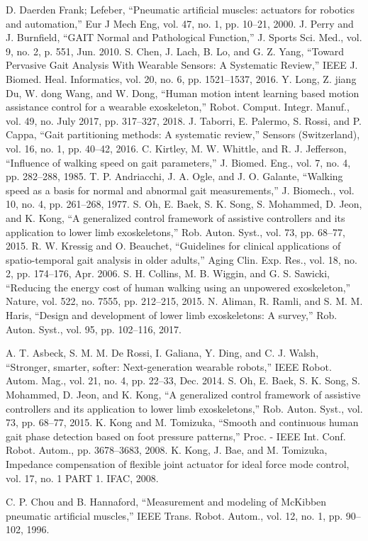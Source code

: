 \documentclass[paper,JRM,paper]{jaciiiarticle}
\begin{document}
\begin{thebibliography}{99}
	D. Daerden Frank; Lefeber, “Pneumatic artificial muscles: actuators for robotics and automation,” Eur J Mech Eng, vol. 47, no. 1, pp. 10–21, 2000.
	J. Perry and J. Burnfield, “GAIT Normal and Pathological Function,” J. Sports Sci. Med., vol. 9, no. 2, p. 551, Jun. 2010.
	S. Chen, J. Lach, B. Lo, and G. Z. Yang, “Toward Pervasive Gait Analysis With Wearable Sensors: A Systematic Review,” IEEE J. Biomed. Heal. Informatics, vol. 20, no. 6, pp. 1521–1537, 2016.
	Y. Long, Z. jiang Du, W. dong Wang, and W. Dong, “Human motion intent learning based motion assistance control for a wearable exoskeleton,” Robot. Comput. Integr. Manuf., vol. 49, no. July 2017, pp. 317–327, 2018.
	J. Taborri, E. Palermo, S. Rossi, and P. Cappa, “Gait partitioning methods: A systematic review,” Sensors (Switzerland), vol. 16, no. 1, pp. 40–42, 2016.
	C. Kirtley, M. W. Whittle, and R. J. Jefferson, “Influence of walking speed on gait parameters,” J. Biomed. Eng., vol. 7, no. 4, pp. 282–288, 1985.
	T. P. Andriacchi, J. A. Ogle, and J. O. Galante, “Walking speed as a basis for normal and abnormal gait measurements,” J. Biomech., vol. 10, no. 4, pp. 261–268, 1977.
	S. Oh, E. Baek, S. K. Song, S. Mohammed, D. Jeon, and K. Kong, “A generalized control framework of assistive controllers and its application to lower limb exoskeletons,” Rob. Auton. Syst., vol. 73, pp. 68–77, 2015.
	R. W. Kressig and O. Beauchet, “Guidelines for clinical applications of spatio-temporal gait analysis in older adults,” Aging Clin. Exp. Res., vol. 18, no. 2, pp. 174–176, Apr. 2006.
	S. H. Collins, M. B. Wiggin, and G. S. Sawicki, “Reducing the energy cost of human walking using an unpowered exoskeleton,” Nature, vol. 522, no. 7555, pp. 212–215, 2015.
	N. Aliman, R. Ramli, and S. M. M. Haris, “Design and development of lower limb exoskeletons: A survey,” Rob. Auton. Syst., vol. 95, pp. 102–116, 2017.


	A. T. Asbeck, S. M. M. De Rossi, I. Galiana, Y. Ding, and C. J. Walsh, “Stronger, smarter, softer: Next-generation wearable robots,” IEEE Robot. Autom. Mag., vol. 21, no. 4, pp. 22–33, Dec. 2014.
	S. Oh, E. Baek, S. K. Song, S. Mohammed, D. Jeon, and K. Kong, “A generalized control framework of assistive controllers and its application to lower limb exoskeletons,” Rob. Auton. Syst., vol. 73, pp. 68–77, 2015.
	K. Kong and M. Tomizuka, “Smooth and continuous human gait phase detection based on foot pressure patterns,” Proc. - IEEE Int. Conf. Robot. Autom., pp. 3678–3683, 2008.
	K. Kong, J. Bae, and M. Tomizuka, Impedance compensation of flexible joint actuator for ideal force mode control, vol. 17, no. 1 PART 1. IFAC, 2008.

	C. P. Chou and B. Hannaford, “Measurement and modeling of McKibben pneumatic artificial muscles,” IEEE Trans. Robot. Autom., vol. 12, no. 1, pp. 90–102, 1996.




\end{thebibliography}
\end{document}
